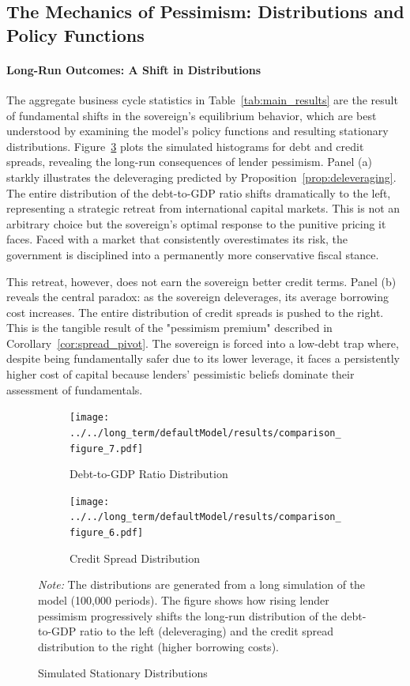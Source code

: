 \documentclass[12pt]{article}
\theoremstyle{plain}
\begin{document}
\subsection{The Mechanics of Pessimism: Distributions and Policy Functions}

\paragraph{Long-Run Outcomes: A Shift in Distributions}
The aggregate business cycle statistics in Table~\ref{tab:main_results} are the
result of fundamental shifts in the sovereign's equilibrium behavior, which are
best understood by examining the model's policy functions and resulting
stationary distributions. Figure~\ref{fig:sim_distributions} plots the
simulated histograms for debt and credit spreads, revealing the long-run
consequences of lender pessimism. Panel (a) starkly illustrates the
deleveraging predicted by Proposition~\ref{prop:deleveraging}. The entire
distribution of the debt-to-GDP ratio shifts dramatically to the left,
representing a strategic retreat from international capital markets. This is
not an arbitrary choice but the sovereign's optimal response to the punitive
pricing it faces. Faced with a market that consistently overestimates its risk,
the government is disciplined into a permanently more conservative fiscal
stance.

This retreat, however, does not earn the sovereign better credit terms. Panel
(b) reveals the central paradox: as the sovereign deleverages, its average
borrowing cost increases. The entire distribution of credit spreads is pushed
to the right. This is the tangible result of the "pessimism premium" described
in Corollary~\ref{cor:spread_pivot}. The sovereign is forced into a low-debt
trap where, despite being fundamentally safer due to its lower leverage, it
faces a persistently higher cost of capital because lenders' pessimistic
beliefs dominate their assessment of fundamentals.

\begin{figure}[h!]
	\centering
	\begin{subfigure}[b]{0.48\textwidth}
		\centering
		\texttt{[image: ../../long\_term/defaultModel/results/comparison\_figure\_7.pdf]}
		\caption{Debt-to-GDP Ratio Distribution}
		\label{fig:dist_debt}
	\end{subfigure}
	\hfill
	\begin{subfigure}[b]{0.48\textwidth}
		\centering
		\texttt{[image: ../../long\_term/defaultModel/results/comparison\_figure\_6.pdf]}
		\caption{Credit Spread Distribution}
		\label{fig:dist_spread}
	\end{subfigure}
	\caption{Simulated Stationary Distributions}
	\label{fig:sim_distributions}
	\parbox{\linewidth}{\small\textit{Note:} The distributions are generated from a long simulation of the model (100,000 periods). The figure shows how rising lender pessimism progressively shifts the long-run distribution of the debt-to-GDP ratio to the left (deleveraging) and the credit spread distribution to the right (higher borrowing costs).}
\end{figure}
\end{document}

